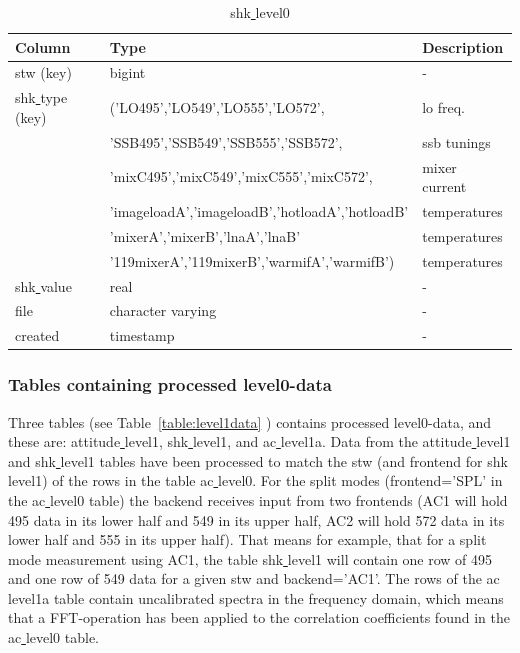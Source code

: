 \documentclass[12pt]{article}
\begin{document}
\begin{table}
\begin{tiny}
\begin{subtable}{.9\linewidth}
      \centering
       \captionsetup{font=scriptsize}
       \label{table:shk0}
\caption{shk\underline{ }level0}
\begin{tabular}{l l l}
\hline
\hline
Column & Type & Description \\ [0.5ex]
\hline
stw (key) & bigint & - \\
shk\underline{ }type (key) & ('LO495','LO549','LO555','LO572',  & lo freq.\\
 & 'SSB495','SSB549','SSB555','SSB572', & ssb tunings\\
 & 'mixC495','mixC549','mixC555','mixC572', & mixer current\\
 & 'imageloadA','imageloadB','hotloadA','hotloadB' & temperatures\\  
 & 'mixerA','mixerB','lnaA','lnaB' &  temperatures\\ 
 & '119mixerA','119mixerB','warmifA','warmifB') & temperatures  \\
shk\underline{ }value & real & -\\
file                      & character varying                   & -\\
created                        & timestamp                   & -\\[1ex]
\hline
\end{tabular}
    \end{subtable} 
 \end{tiny}    
\end{table}

\clearpage
\newpage


\subsubsection{Tables containing processed level0-data}
Three tables (see Table~\ref{table:level1data} ) contains processed 
level0-data,
and these are: attitude\underline{ }level1, shk\underline{ }level1, 
and ac\underline{ }level1a.
Data from the attitude\underline{ }level1 and shk\underline{ }level1 
tables have been
processed to match the stw (and frontend for shk\underline{ }level1) 
of the rows in the  table ac\underline{ }level0.
For the split modes (frontend='SPL' in the ac\underline{ }level0 table)
the backend receives input from two frontends (AC1 will hold 495 data 
in its lower half and 549 in its upper half, AC2 will hold 572 data in its
lower half and 555 in its upper half). That means for example, 
that for a split mode measurement using AC1, the table 
shk\underline{ }level1 will contain one row of 495 and one row of
549 data for a given stw and backend='AC1'.
The rows of the ac\underline{ }level1a table contain 
uncalibrated spectra in the frequency domain, which means that
a FFT-operation has been applied to the correlation coefficients found 
in the ac\underline{ }level0 table. 
\end{document}
